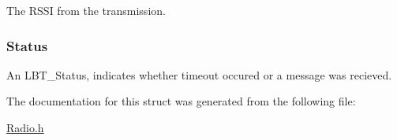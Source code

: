 The R\+S\+S\+I from the transmission. 

\hypertarget{struct_listen___struct_ae616177a91ea7bd7140e1694f59ef4ea}{}
\subsubsection[{Status}]{ Status}\label{struct_listen___struct_ae616177a91ea7bd7140e1694f59ef4ea}


An L\+B\+T\+\_\+\+Status, indicates whether timeout occured or a message was recieved. 



The documentation for this struct was generated from the following file\+:\begin{DoxyCompactItemize}
\item 
\hyperlink{_radio_8h}{Radio.\+h}\end{DoxyCompactItemize}
